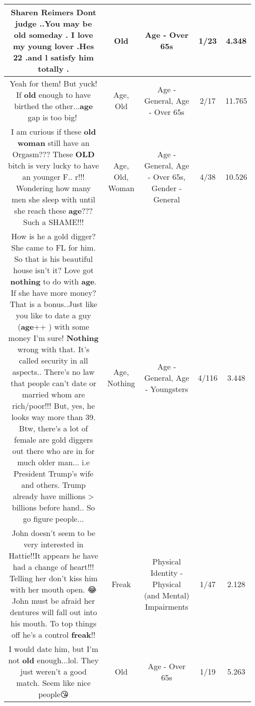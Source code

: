 \documentclass[11pt]{article}
\newlength\mylength
\begin{document}
\begin{center}
\begin{longtable}{|C{.65\mylength}|C{.30\mylength}|C{.12\mylength}|C{.12\mylength}|C{.12\mylength}|}
  \small Sharen Reimers Dont judge ..You may be \textbf{old} someday . I love  my young lover .Hes 22 .and l satisfy him totally .\normalsize   & Old & Age - Over 65s & 1/23 & 4.348 \\  \hline
  \small Yeah for them! But yuck! If \textbf{old} enough to have birthed the other...\textbf{age} gap is too big!🤮\normalsize   & Age, Old & Age - General, Age - Over 65s & 2/17 & 11.765 \\  \hline
  \small I am curious  if these \textbf{old} \textbf{woman} still have an  Orgasm??? These  \textbf{OLD} bitch is very lucky to have an younger F.. r!!! Wondering how many men she sleep with until she reach these \textbf{age}??? Such a SHAME!!!\normalsize   & Age, Old, Woman & Age - General, Age - Over 65s, Gender - General & 4/38 & 10.526 \\  \hline
  \small How is he a gold digger? She came to FL for him. So that is his beautiful house isn't it? Love got \textbf{nothing} to do with \textbf{age}. If she have more money? That is a bonus..Just like you like to date a guy (\textbf{age}++ ) with some money I'm sure! \textbf{Nothing} wrong with that. It's called security in all aspects.. There's no law that people can't date or married whom are rich/poor!!! But, yes, he looks way more than 39. Btw, there's a lot of female are gold diggers out there who are in for much older man... i.e President Trump's wife and others. Trump already have millions > billions before hand.. So go figure people...\normalsize   & Age, Nothing & Age - General, Age - Youngsters & 4/116 & 3.448 \\  \hline
  \small John doesn't seem to be very interested in Hattie!!It appears he have had a change of heart!!! Telling her don't kiss him with her mouth open. 😂 John must be afraid her dentures will fall out into his mouth. To top things off he's a control \textbf{freak}!!\normalsize   & Freak & Physical Identity - Physical (and Mental) Impairments & 1/47 & 2.128 \\  \hline
  \small I would date him, but I'm not \textbf{old} enough...lol. They just weren't a good match. Seem like nice people😘\normalsize   & Old & Age - Over 65s & 1/19 & 5.263 \\  \hline

\end{longtable}
\end{center}
\end{document}
